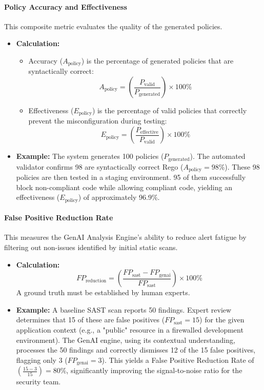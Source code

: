 \paragraph{Policy Accuracy and Effectiveness} This composite metric evaluates the quality of the generated policies.
\begin{itemize}
    \item \textbf{Calculation:}
        \begin{itemize}
            \item Accuracy (\( A_{\text{policy}} \)) is the percentage of generated policies that are syntactically correct:
            \[ A_{\text{policy}} = \left(\frac{P_{\text{valid}}}{P_{\text{generated}}}\right) \times 100\% \]
            \item Effectiveness (\( E_{\text{policy}} \)) is the percentage of valid policies that correctly prevent the misconfiguration during testing:
            \[ E_{\text{policy}} = \left(\frac{P_{\text{effective}}}{P_{\text{valid}}}\right) \times 100\% \]
        \end{itemize}
    \item \textbf{Example:} The system generates 100 policies (\( P_{\text{generated}} \)). The automated validator confirms 98 are syntactically correct Rego (\( A_{\text{policy}} = 98\% \)). These 98 policies are then tested in a staging environment. 95 of them successfully block non-compliant code while allowing compliant code, yielding an effectiveness (\( E_{\text{policy}} \)) of approximately 96.9\%.
\end{itemize}

\paragraph{False Positive Reduction Rate} This measures the GenAI Analysis Engine's ability to reduce alert fatigue by filtering out non-issues identified by initial static scans.
\begin{itemize}
    \item \textbf{Calculation:} \[ FP_{\text{reduction}} = \left(\frac{FP_{\text{sast}} - FP_{\text{genai}}}{FP_{\text{sast}}}\right) \times 100\% \] A ground truth must be established by human experts.
    \item \textbf{Example:} A baseline SAST scan reports 50 findings. Expert review determines that 15 of these are false positives (\( FP_{\text{sast}} = 15 \)) for the given application context (e.g., a "public" resource in a firewalled development environment). The GenAI engine, using its contextual understanding, processes the 50 findings and correctly dismisses 12 of the 15 false positives, flagging only 3 (\( FP_{\text{genai}} = 3 \)). This yields a False Positive Reduction Rate of \( \left(\frac{15 - 3}{15}\right) = 80\% \), significantly improving the signal-to-noise ratio for the security team.
\end{itemize}

